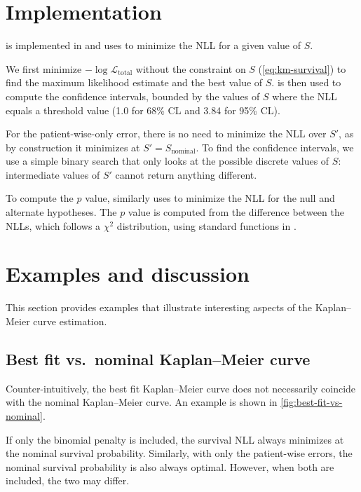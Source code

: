 \documentclass[article]{jss}
\newcommand{\KM}{Kaplan--Meier} %
\begin{document}
\section{Implementation}

 is implemented in  and uses  \citep{gurobi} to minimize the NLL for a given value of \(S\).

We first minimize \(-\log \mathcal{L}_{\text{total}}\) without the constraint on \(S\) (\ref{eq:km-survival}) to find the maximum likelihood estimate and the best value of \(S\)\@.  \citep{brentq,scipy} is then used to compute the confidence intervals, bounded by the values of \(S\) where the NLL equals a threshold value (1.0 for 68\% CL and 3.84 for 95\% CL).

For the patient-wise-only error, there is no need to minimize the NLL over \(S'\), as by construction it minimizes at \(S'=S_\text{nominal}\). To find the confidence intervals, we use a simple binary search that only looks at the possible discrete values of \(S\): intermediate values of \(S'\) cannot return anything different.

To compute the \(p\) value,  similarly uses  to minimize the NLL for the null and alternate hypotheses.  The \(p\) value is computed from the difference between the NLLs, which follows a \(\chi^2\) distribution, using standard functions in .

\section{Examples and discussion}

This section provides examples that illustrate interesting aspects of the \KM{} curve estimation.

\subsection%
[Best fit vs. nominal \KM{} curve]%
{Best fit vs.\ nominal \KM{} curve}

Counter-intuitively, the best fit \KM{} curve does not necessarily coincide with the nominal \KM{} curve. An example is shown in \cref{fig:best-fit-vs-nominal}.

If only the binomial penalty is included, the survival NLL always minimizes at the nominal survival probability. Similarly, with only the patient-wise errors, the nominal survival probability is also always optimal. However, when both are included, the two may differ.
\end{document}

